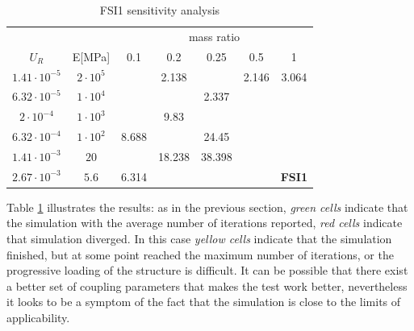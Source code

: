 %
\begin{table}[!hb]
	\begin{center}
		\begin{tabular}{ c | c | c c c c c |} 
			&  & \multicolumn{5}{c}{mass ratio} \\
			
			$U_R$ & E[\si{MPa}] & 0.1 & 0.2 & 0.25 & 0.5 & 1 \\
			\hline
			
			$1.41\cdot 10^{-5}$ & $2\cdot 10^{5}$ & \cellcolor{green!10} & \cellcolor{green!10}2.138 & \cellcolor{green!10} & \cellcolor{green!10}2.146 & \cellcolor{green!10}3.064 \\
			$6.32\cdot 10^{-5}$ & $1\cdot 10^{4}$ & \cellcolor{green!10} & \cellcolor{green!10} & \cellcolor{green!10}2.337 & \cellcolor{red!10} & \cellcolor{red!10} \\        
			$2\cdot 10^{-4}$ & $1\cdot 10^{3}$ & \cellcolor{green!10} & \cellcolor{green!10}9.83 & \cellcolor{yellow!10} & \cellcolor{red!10} & \cellcolor{red!10} \\
			$6.32\cdot 10^{-4}$ & $1\cdot 10^{2}$ & \cellcolor{green!10}8.688 & \cellcolor{green!10} & \cellcolor{yellow!10} 24.45 & \cellcolor{red!10} & \cellcolor{red!10} \\
			$1.41\cdot 10^{-3}$ & $20$ & \cellcolor{green!10} & \cellcolor{yellow!10}18.238 & \cellcolor{yellow!10}38.398 & \cellcolor{red!10} & \cellcolor{red!10} \\
			$2.67\cdot 10^{-3}$ & $5.6$ & \cellcolor{green!10}6.314 & \cellcolor{red!10} & \cellcolor{red!10} & \cellcolor{red!10} & \cellcolor{red!10}\textbf{FSI1} \\
			\hline                        
		\end{tabular}
	\end{center}
	\caption{FSI1 sensitivity analysis}
	\label{table:FSI1-sens}
\end{table}

Table \ref{table:FSI1-sens} illustrates the results: as in the previous section, \textit{green cells} indicate that the simulation with the average number of iterations reported, \textit{red cells} indicate that simulation diverged. In this case \textit{yellow cells} indicate that the simulation finished, but at some point reached the maximum number of iterations, or the progressive loading of the structure is difficult. It can be possible that there exist a better set of coupling parameters that makes the test work better, nevertheless it looks to be a symptom of the fact that the simulation is close to the limits of applicability.

